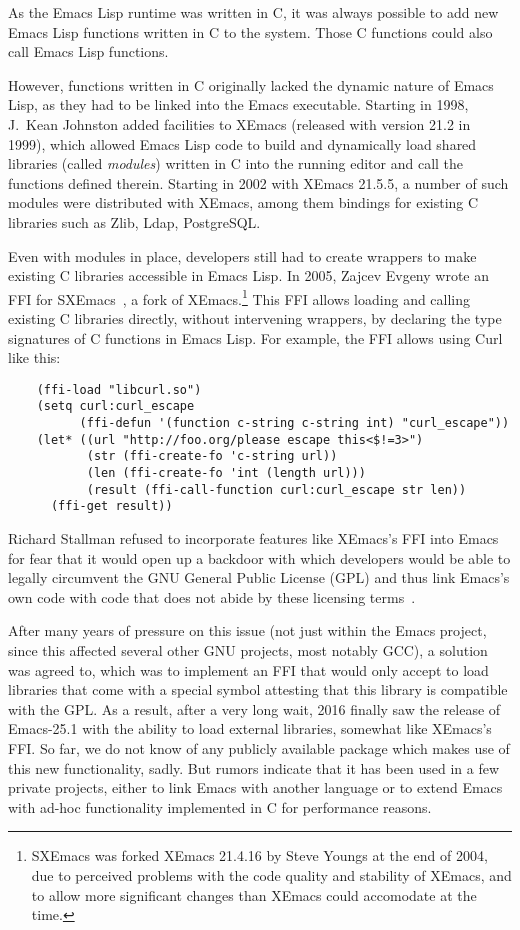 \documentclass[format=acmsmall, review]{acmart}
\newcommand \Elisp {Emacs Lisp}
\begin{document}
As the \Elisp{} runtime was written in C, it was always possible to
add new \Elisp{} functions written in C to the system.  Those C
functions could also call \Elisp{} functions.

However, functions written in C originally lacked the dynamic nature
of \Elisp{}, as they had to be linked into the Emacs executable.
Starting in 1998, J.\ Kean Johnston added facilities to XEmacs
(released with version 21.2 in 1999), which allowed \Elisp{} code to
build and dynamically load shared libraries (called \textit{modules})
written in C into the running editor and call the functions defined
therein.  Starting in 2002 with XEmacs 21.5.5, a number of such modules
were distributed with XEmacs, among them bindings for existing C
libraries such as Zlib, Ldap, PostgreSQL.

Even with modules in place, developers still had to create wrappers to
make existing C libraries accessible in \Elisp{}.  In 2005, Zajcev
Evgeny wrote an FFI for SXEmacs~\cite{SXEmacs}, a fork of
XEmacs.\footnote{SXEmacs was forked XEmacs 21.4.16 by Steve Youngs at
  the end of 2004, due to perceived problems with the code quality and
stability of XEmacs, and to allow more significant changes than XEmacs
could accomodate at the time.}
This FFI allows loading and calling existing C libraries directly,
without intervening wrappers, by declaring the type signatures of C
functions in \Elisp{}.  For example, the FFI allows using Curl like
this:
\begin{verbatim}
    (ffi-load "libcurl.so")
    (setq curl:curl_escape
          (ffi-defun '(function c-string c-string int) "curl_escape"))
    (let* ((url "http://foo.org/please escape this<$!=3>")
           (str (ffi-create-fo 'c-string url))
           (len (ffi-create-fo 'int (length url)))
           (result (ffi-call-function curl:curl_escape str len))
      (ffi-get result))
\end{verbatim}

Richard Stallman refused to incorporate features like XEmacs's FFI into Emacs for fear
that it would open up a backdoor with which developers would be able to
legally circumvent the GNU General Public License (GPL) and thus link
Emacs's own code with code that does not abide by these licensing terms~\cite{RMS03}.

After many years of pressure on this issue (not just within the Emacs
project, since this affected several other GNU projects, most notably GCC),
a solution was agreed to, which was to implement an FFI that would only
accept to load libraries that come with a special symbol attesting that this
library is compatible with the GPL.  As a result, after a very long wait,
2016 finally saw the release of Emacs-25.1 with the ability to load external
libraries, somewhat like XEmacs's FFI.  So far, we do not know of any publicly
available package which makes use of this new functionality, sadly.
But rumors indicate that it has been used in a few private projects, either
to link Emacs with another language or to extend Emacs with ad-hoc
functionality implemented in C for performance reasons.
\end{document}
